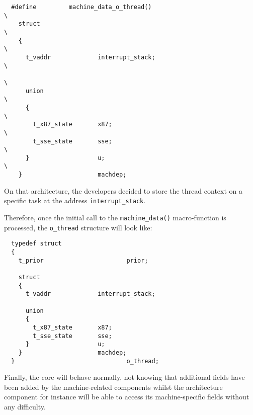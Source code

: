 \begin{verbatim}
  #define         machine_data_o_thread()                                 \
    struct                                                                \
    {                                                                     \
      t_vaddr             interrupt_stack;                                \
                                                                          \
      union                                                               \
      {                                                                   \
        t_x87_state       x87;                                            \
        t_sse_state       sse;                                            \
      }                   u;                                              \
    }                     machdep;
\end{verbatim}

On that architecture, the developers decided to store the thread context
on a specific task at the address \texttt{interrupt\_stack}.

Therefore, once the initial call to the \texttt{machine\_data()} macro-function
is processed, the \texttt{o\_thread} structure will look like:

\begin{verbatim}
  typedef struct
  {
    t_prior                       prior;

    struct
    {
      t_vaddr             interrupt_stack;

      union
      {
        t_x87_state       x87;
        t_sse_state       sse;
      }                   u;
    }                     machdep;
  }                               o_thread;
\end{verbatim}

Finally, the core will behave normally, not knowing that additional fields
have been added by the machine-related components whilst the architecture
component for instance will be able to access its machine-specific fields
without any difficulty.


